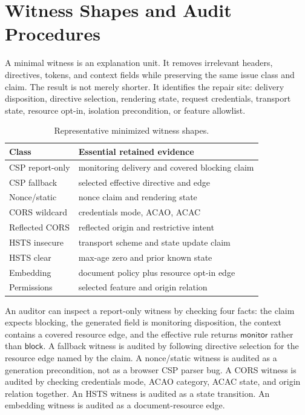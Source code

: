 \documentclass[10pt,conference]{IEEEtran}
\newcommand{\block}{\ensuremath{\mathsf{block}}}
\newcommand{\monitor}{\ensuremath{\mathsf{monitor}}}
\begin{document}
\section{Witness Shapes and Audit Procedures}

A minimal witness is an explanation unit. It removes irrelevant headers, directives, tokens, and context fields while preserving the same issue class and claim. The result is not merely shorter. It identifies the repair site: delivery disposition, directive selection, rendering state, request credentials, transport state, resource opt-in, isolation precondition, or feature allowlist.

\begin{table}[t]
\centering
\caption{Representative minimized witness shapes.}
\label{tab:supp-witnesses}
\begin{tabular}{p{}p{}}
\toprule
Class & Essential retained evidence \\
\midrule
CSP report-only & monitoring delivery and covered blocking claim \\
CSP fallback & selected effective directive and edge \\
Nonce/static & nonce claim and rendering state \\
CORS wildcard & credentials mode, ACAO, ACAC \\
Reflected CORS & reflected origin and restrictive intent \\
HSTS insecure & transport scheme and state update claim \\
HSTS clear & max-age zero and prior known state \\
Embedding & document policy plus resource opt-in edge \\
Permissions & selected feature and origin relation \\
\bottomrule
\end{tabular}
\end{table}

An auditor can inspect a report-only witness by checking four facts: the claim expects blocking, the generated field is monitoring disposition, the context contains a covered resource edge, and the effective rule returns \monitor{} rather than \block{}. A fallback witness is audited by following directive selection for the resource edge named by the claim. A nonce/static witness is audited as a generation precondition, not as a browser CSP parser bug. A CORS witness is audited by checking credentials mode, ACAO category, ACAC state, and origin relation together. An HSTS witness is audited as a state transition. An embedding witness is audited as a document-resource edge.
\end{document}
